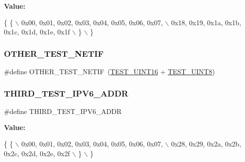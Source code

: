 {\bfseries Value\+:}
\begin{DoxyCode}
\{ \{ \(\backslash\)
            0x00, 0x01, 0x02, 0x03, 0x04, 0x05, 0x06, 0x07, \(\backslash\)
            0x18, 0x19, 0x1a, 0x1b, 0x1c, 0x1d, 0x1e, 0x1f \(\backslash\)
        \} \(\backslash\)
    \}
\end{DoxyCode}
\mbox{\label{tests-ipv6__nc_8c_a28844d5b26d53ea819be44b1ad562be1}} 
\subsubsection{\texorpdfstring{O\+T\+H\+E\+R\+\_\+\+T\+E\+S\+T\+\_\+\+N\+E\+T\+IF}{OTHER\_TEST\_NETIF}}
{\footnotesize\ttfamily \#define O\+T\+H\+E\+R\+\_\+\+T\+E\+S\+T\+\_\+\+N\+E\+T\+IF~(\hyperlink{unittests-constants_8h_ada84310dd4f52d94096d5baed5eb75e1}{T\+E\+S\+T\+\_\+\+U\+I\+N\+T16} + \hyperlink{unittests-constants_8h_a9a493e3e4fe69d0b8c338869ebcadbc4}{T\+E\+S\+T\+\_\+\+U\+I\+N\+T8})}

\mbox{\label{tests-ipv6__nc_8c_aca2fb5fe61ac325bd1fd5e0e475f0e69}} 
\subsubsection{\texorpdfstring{T\+H\+I\+R\+D\+\_\+\+T\+E\+S\+T\+\_\+\+I\+P\+V6\+\_\+\+A\+D\+DR}{THIRD\_TEST\_IPV6\_ADDR}}
{\footnotesize\ttfamily \#define T\+H\+I\+R\+D\+\_\+\+T\+E\+S\+T\+\_\+\+I\+P\+V6\+\_\+\+A\+D\+DR}

{\bfseries Value\+:}
\begin{DoxyCode}
\{ \{ \(\backslash\)
            0x00, 0x01, 0x02, 0x03, 0x04, 0x05, 0x06, 0x07, \(\backslash\)
            0x28, 0x29, 0x2a, 0x2b, 0x2c, 0x2d, 0x2e, 0x2f \(\backslash\)
        \} \(\backslash\)
    \}
\end{DoxyCode}



